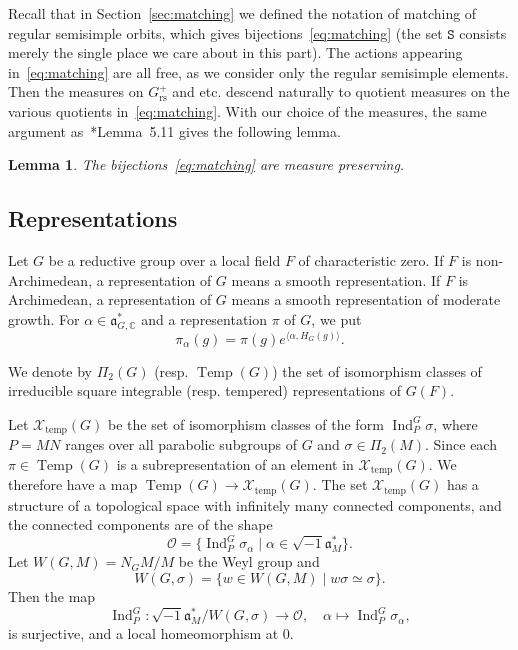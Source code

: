 \documentclass[letterpaper,11pt]{amsart}
\newcommand{\fa}{\mathfrak{a}}
\newcommand{\C}{\mathbb{C}}
\newcommand{\cO}{\mathcal{O}}
\newcommand{\cX}{\mathcal{X}}
\newcommand{\tS}{\mathtt{S}}
\newcommand{\<}{\negthickspace}
\DeclareMathOperator{\Ind}{Ind}
\DeclareMathOperator{\Temp}{Temp} \DeclareMathOperator{\temp}{temp}
\DeclareMathOperator{\rs}{rs}
\theoremstyle{definition}
\theoremstyle{plain}
\newtheorem{lemma}[definition]{Lemma}
\theoremstyle{remark}
\numberwithin{equation}{section}
\begin{document}
Recall that in Section~\ref{sec:matching} we defined the notation of matching of regular semisimple orbits, which gives bijections~\eqref{eq:matching} (the set $\tS$ consists merely the single place we care about in this part). The actions appearing in~\eqref{eq:matching} are all free, as we
consider only the regular semisimple elements. Then the measures on
$G^+_{\rs}$ and etc. descend naturally to quotient measures on the
various quotients in~\eqref{eq:matching}. With our choice of the measures, the same argument
as~\cite{BP1}*{Lemma~5.11} gives the following lemma.


\begin{lemma}   \label{lemma:matching_measure}
The bijections~\eqref{eq:matching} are measure preserving.
\end{lemma}





\subsection{Representations}
Let $G$ be a reductive group over a local field $F$ of characteristic zero.
If $F$ is non-Archimedean, a representation of $G$ means a smooth
representation. If $F$ is Archimedean, a representation of $G$ means a smooth
representation of moderate growth.
For $\alpha \in \fa_{G,\C}^*$ and a representation $\pi$ of $G$, we put
    \[
    \pi_\alpha(g) = \pi(g) e^{\langle \alpha, H_G(g)\rangle}.
    \]

We denote by $\Pi_2(G)$ (resp. $\Temp(G)$) the set of isomorphism classes of
irreducible square integrable (resp. tempered) representations of $G(F)$.

Let $\cX_{\temp}(G)$ be the set of isomorphism classes of the form
$\Ind_{P}^{G} \sigma$, where $P = MN$ ranges over all parabolic subgroups of
$G$ and $\sigma \in \Pi_2(M)$. Since each $\pi \in \Temp(G)$ is a
subrepresentation of an element in $\cX_{\temp}(G)$. We therefore have a map
$\Temp(G) \to \cX_{\temp}(G)$. The set $\cX_{\temp}(G)$ has a structure of a
topological space with infinitely many connected components, and the connected
components are of the shape
    \[
    \cO =
    \{ \Ind_{P}^{G} \sigma_{\alpha} \mid \alpha \in \sqrt{-1} \fa_M^*\}.
    \]
Let $W(G, M) = N_{G}M/M$ be the Weyl group and
    \[
    W(G, \sigma) = \{ w \in W(G, M) \mid w \sigma \simeq \sigma\}.
    \]
Then the map
    \[
    \Ind_{P}^G: \sqrt{-1}\fa_M^* /W(G, \sigma) \to \cO, \quad
    \alpha \mapsto \Ind_{P}^{G} \sigma_{\alpha},
    \]
is surjective, and a local
homeomorphism at $0$.
\end{document}
